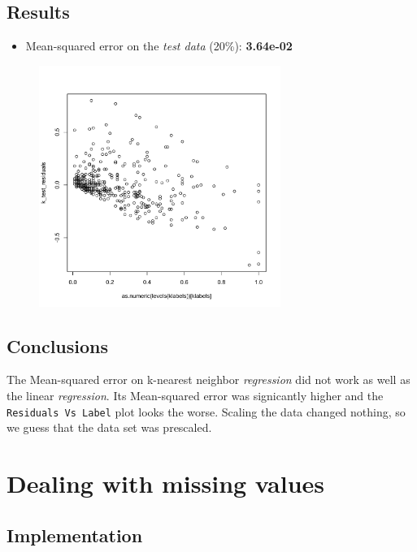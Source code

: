 \documentclass[12pt,a4paper]{article}
\begin{document}
\begin{singlespace}
\subsection{Results}
\begin{itemize}
    \item Mean-squared error on the \emph{test data} (20\%): \textbf{3.64e-02}
\end{itemize}

\vspace{-0.5cm}
\begin{figure}[h!]
    \centering
    \includegraphics[width=0.7\textwidth,trim= 0 0 20 30, clip]{NN_regression_residuals.pdf}
\end{figure}
\FloatBarrier


\subsection{Conclusions}
The Mean-squared error on k-nearest neighbor \emph{regression} did not work as well as the linear \emph{regression}. Its Mean-squared error was signicantly higher and the \texttt{Residuals Vs Label} plot looks the worse. Scaling the data changed nothing, so we guess that the data set was prescaled.

\newpage
\section{Dealing with missing values}
\subsection{Implementation}


\end{singlespace}
\end{document}
